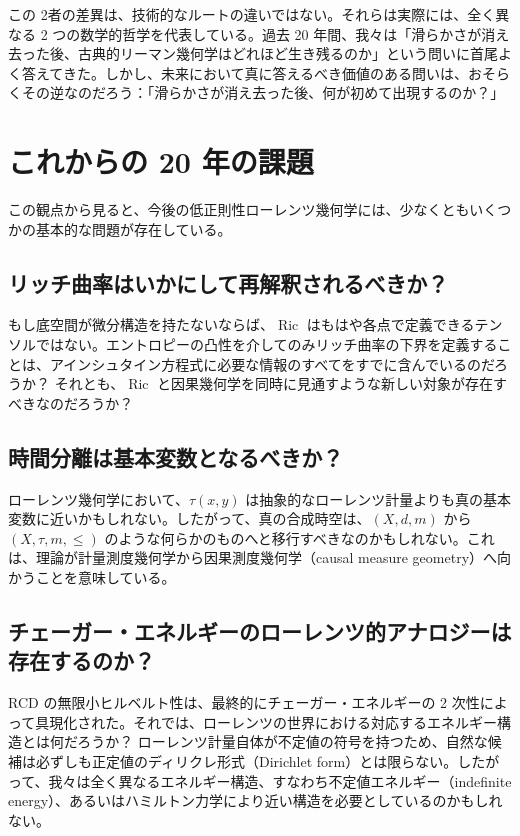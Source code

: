 \documentclass[lualatex]{ltjsarticle}
\begin{document}
この 2者の差異は、技術的なルートの違いではない。それらは実際には、全く異なる 2 つの数学的哲学を代表している。過去 20 年間、我々は「滑らかさが消え去った後、古典的リーマン幾何学はどれほど生き残るのか」という問いに首尾よく答えてきた。しかし、未来において真に答えるべき価値のある問いは、おそらくその逆なのだろう：「滑らかさが消え去った後、何が初めて出現するのか？」

\section{これからの 20 年の課題}

この観点から見ると、今後の低正則性ローレンツ幾何学には、少なくともいくつかの基本的な問題が存在している。

\subsection{リッチ曲率はいかにして再解釈されるべきか？}

もし底空間が微分構造を持たないならば、$\operatorname{Ric}$ はもはや各点で定義できるテンソルではない。エントロピーの凸性を介してのみリッチ曲率の下界を定義することは、アインシュタイン方程式に必要な情報のすべてをすでに含んでいるのだろうか？ それとも、$\operatorname{Ric}$ と因果幾何学を同時に見通すような新しい対象が存在すべきなのだろうか？

\subsection{時間分離は基本変数となるべきか？}

ローレンツ幾何学において、$\tau(x,y)$ は抽象的なローレンツ計量よりも真の基本変数に近いかもしれない。したがって、真の合成時空は、$(X,d,m)$ から $(X,\tau,m,\leq)$ のような何らかのものへと移行すべきなのかもしれない。これは、理論が計量測度幾何学から因果測度幾何学（causal measure geometry）へ向かうことを意味している。

\subsection{チェーガー・エネルギーのローレンツ的アナロジーは存在するのか？}

RCD の無限小ヒルベルト性は、最終的にチェーガー・エネルギーの 2 次性によって具現化された。それでは、ローレンツの世界における対応するエネルギー構造とは何だろうか？ ローレンツ計量自体が不定値の符号を持つため、自然な候補は必ずしも正定値のディリクレ形式（Dirichlet form）とは限らない。したがって、我々は全く異なるエネルギー構造、すなわち不定値エネルギー（indefinite energy）、あるいはハミルトン力学により近い構造を必要としているのかもしれない。
\end{document}
